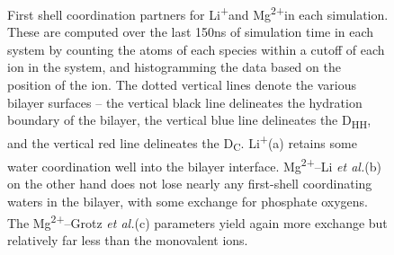 \documentclass[12pt,openany,final]{book}
\newcommand{\etal}{\textit{et al.}}
\newcommand{\li}{Li\textsuperscript{+}}
\newcommand{\mg}{Mg\textsuperscript{2+}}
\newcommand{\mgmbnbfix}{Mg\textsuperscript{2+}--Li \etal} %
\newcommand{\mgmicro}{Mg\textsuperscript{2+}--Grotz \etal}
\begin{document}
\begin{figure}
    \caption[Coordination partners for \li and \mg]{First shell coordination partners 
        for \li and \mg in each simulation. 
        These are computed over the last 150ns of 
        simulation time in each system by counting 
        the atoms of each species within a cutoff 
        of each ion in the system, and histogramming 
        the data based on the position of the ion. 
        The dotted vertical lines denote the various 
        bilayer surfaces -- the vertical black
        line delineates the hydration boundary of the bilayer,
        the vertical blue line delineates the D\textsubscript{HH},
        and the vertical red line delineates the D\textsubscript{C}.
        \li (a) retains some water 
        coordination well into the bilayer
        interface.
        \mgmbnbfix (b) on the other hand does not lose
        nearly any first-shell coordinating
        waters in the bilayer, with some exchange for phosphate
        oxygens. The \mgmicro (c) parameters yield again more exchange but 
        relatively far less than the monovalent
    ions.}
    \label{fig:cood:ch2}

\end{figure}
\end{document}
